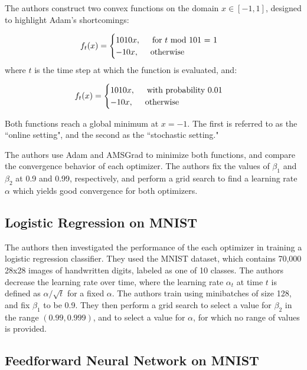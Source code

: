 \documentclass[letterpaper, 10 pt, conference]{ieeeconf}  %
\begin{document}
The authors construct two convex functions on the domain $x \in [-1,1]$, designed to highlight Adam's shortcomings:

\[
    f_{t}(x) = 
    \begin{cases}
     	1010x, \hspace{5mm} \text{for } t \text{ mod 101 = 1} \\
        -10x, \hspace{5mm} \text{otherwise}
    \end{cases}
\]
where $t$ is the time step at which the function is evaluated, and:

\[
    f_{t}(x) = 
    \begin{cases}
     	1010x, \hspace{5mm} \text{with probability 0.01}\\
        -10x, \hspace{5mm} \text{otherwise}
    \end{cases}
\]

Both functions reach a global minimum at $x = -1$. The first is referred to as the ``online setting", and the second as the ``stochastic setting."

The authors use Adam and AMSGrad to minimize both functions, and compare the convergence behavior of each optimizer. The authors fix the values of  $\beta_{1}$ and $\beta_{2}$ at 0.9 and 0.99, respectively, and perform a grid search to find a learning rate $\alpha$ which yields good convergence for both optimizers. 

\subsection{Logistic Regression on MNIST}

The authors then investigated the performance of the each optimizer in training a logistic regression classifier. They used the MNIST dataset, which contains 70,000 28x28 images of handwritten digits, labeled as one of 10 classes. The authors decrease the learning rate over time, where the learning rate $\alpha_t$ at time $t$ is defined as $\alpha / \sqrt{t}$ for a fixed $\alpha$. The authors train using minibatches of size 128, and fix  $\beta_{1}$ to be 0.9. They then perform a grid search to select a value for $\beta_2$ in the range $(0.99, 0.999)$, and to select a value for $\alpha$, for which no range of values is provided.

\subsection{Feedforward Neural Network on MNIST}
\end{document}
